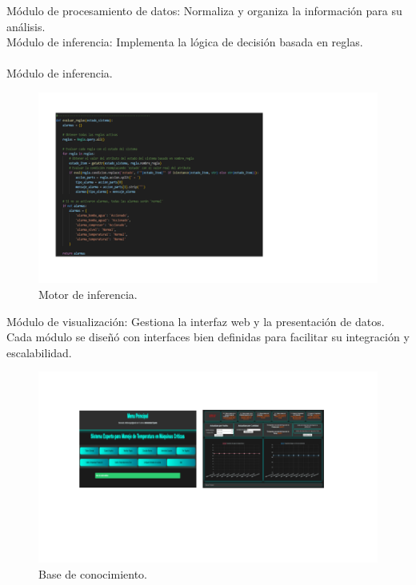 Módulo de procesamiento de datos: Normaliza y organiza la información para su análisis.\\
Módulo de inferencia: Implementa la lógica de decisión basada en reglas. \\
\\
Módulo de inferencia. \\

\begin{figure}[H]
    \begin{center}
    \includegraphics[scale = 0.7]{./images/motor de inferencia.png}
    \caption{Motor de inferencia.}
    \label{fig:huella}
    \end{center}
    \end{figure}


Módulo de visualización: Gestiona la interfaz web y la presentación de datos. \\
Cada módulo se diseñó con interfaces bien definidas para facilitar su integración y escalabilidad. \\

\begin{figure}[H]
    \begin{center}
    \includegraphics[scale = 0.6]{./images/desarrollo de sistema.png}
    \caption{Base de conocimiento.}
    \label{fig:huella}
    \end{center}
    \end{figure}


